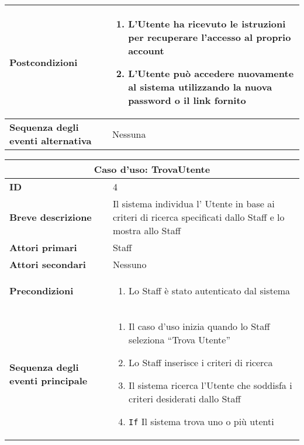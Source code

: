 \documentclass[a4paper]{report}
\begin{document}
\begin{table}[H]
\begin{tabular}{|p{3.9cm}|p{9.9cm}|}
\textbf{Postcondizioni} & \begin{enumerate}[leftmargin=14pt,label=\arabic*.,labelsep=0.5em,topsep=0pt,partopsep=0pt,parsep=0pt,itemsep=0pt]
    \item L’Utente ha ricevuto le istruzioni per recuperare l’accesso al proprio account
    \item L’Utente può accedere nuovamente al sistema utilizzando la nuova password o il link fornito
    \end{enumerate} \\ \hline
\textbf{Sequenza degli eventi alternativa} & Nessuna \\ \hline
\end{tabular}
\end{table}


\clearpage
\begin{table}[H]
\vspace*{-0cm}
\renewcommand{\arraystretch}{1.9}
\begin{tabular}{|p{3.9cm}|p{9.9cm}|}
\hline
\multicolumn{2}{|c|}{\textbf{Caso d’uso: TrovaUtente}} \\ \hline
\textbf{ID} & 4 \\ \hline
\textbf{Breve descrizione} & Il sistema individua l’ Utente in base ai criteri di ricerca specificati dallo Staff e lo mostra allo Staff \\ \hline
\textbf{Attori primari} & Staff \\ \hline
\textbf{Attori secondari} & Nessuno \\ \hline
\textbf{Precondizioni} & \begin{enumerate}[leftmargin=14pt,label=\arabic*.,labelsep=0.5em,topsep=0pt,partopsep=0pt,parsep=0pt,itemsep=0pt]
    \item Lo Staff è stato autenticato dal sistema
\end{enumerate} \\ \hline
\textbf{Sequenza degli eventi principale} &
\begin{enumerate}[leftmargin=14pt,label=\arabic*.,labelsep=0.5em,topsep=0pt,partopsep=0pt,parsep=0pt,itemsep=0pt]
    \item Il caso d’uso inizia quando lo Staff seleziona “Trova Utente”
    \item Lo Staff inserisce i criteri di ricerca
    \item Il sistema ricerca l’Utente che soddisfa i criteri desiderati dallo Staff
    \item \texttt{If} Il sistema trova uno o più utenti
    \begin{enumerate}[label=\arabic{enumi}.\arabic{enumii}.,leftmargin=22pt,labelsep=0.5em,topsep=0pt,partopsep=0pt,parsep=0pt,itemsep=0pt]

\end{enumerate}
\end{enumerate}
\end{tabular}
\end{table}
\end{document}
